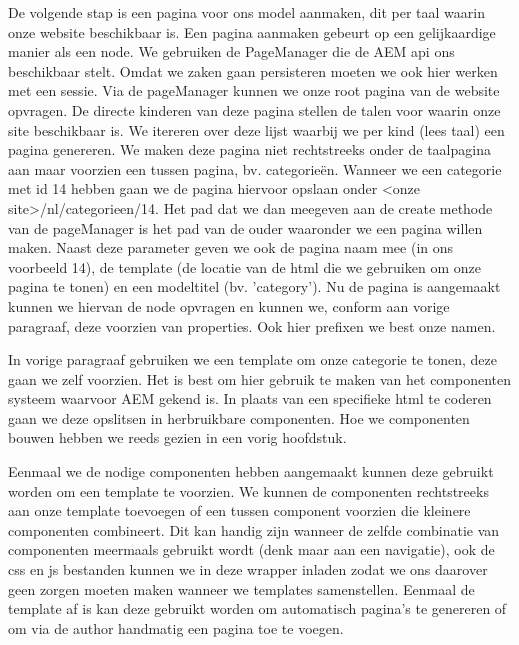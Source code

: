 \documentclass{article}
\begin{document}
	De volgende stap is een pagina voor ons model aanmaken, dit per taal waarin onze website beschikbaar is. Een pagina aanmaken gebeurt op een gelijkaardige manier als een node. We gebruiken de PageManager die de AEM api ons beschikbaar stelt. Omdat we zaken gaan persisteren moeten we ook hier werken met een sessie. Via de pageManager kunnen we onze root pagina van de website opvragen. De directe kinderen van deze pagina stellen de talen voor waarin onze site beschikbaar is. We itereren over deze lijst waarbij we per kind (lees taal) een pagina genereren. We maken deze pagina niet rechtstreeks onder de taalpagina aan maar voorzien een tussen pagina, bv. categorie\"en. Wanneer we een categorie met id 14 hebben gaan we de pagina hiervoor opslaan onder <onze site>/nl/categorieen/14. Het pad dat we dan meegeven aan de create methode van de pageManager is het pad van de ouder waaronder we een pagina willen maken. Naast deze parameter geven we ook de pagina naam mee (in ons voorbeeld 14), de template (de locatie van de html die we gebruiken om onze pagina te tonen) en een modeltitel (bv. 'category'). Nu de pagina is aangemaakt kunnen we hiervan de node opvragen en kunnen we, conform aan vorige paragraaf, deze voorzien van properties. Ook hier prefixen we best onze namen.
    \par
    In vorige paragraaf gebruiken we een template om onze categorie te tonen, deze gaan we zelf voorzien. Het is best om hier gebruik te maken van het componenten systeem waarvoor AEM gekend is. In plaats van een specifieke html te coderen gaan we deze opslitsen in herbruikbare componenten. Hoe we componenten bouwen hebben we reeds gezien in een vorig hoofdstuk.
    \par
    Eenmaal we de nodige componenten hebben aangemaakt kunnen deze gebruikt worden om een template te voorzien. We kunnen de componenten rechtstreeks aan onze template toevoegen of een tussen component voorzien die kleinere componenten combineert. Dit kan handig zijn wanneer de zelfde combinatie van componenten meermaals gebruikt wordt (denk maar aan een navigatie), ook de css en js bestanden kunnen we in deze wrapper inladen zodat we ons daarover geen zorgen moeten maken wanneer we templates samenstellen. Eenmaal de template af is kan deze gebruikt worden om automatisch pagina's te genereren of om via de author handmatig een pagina toe te voegen.
\end{document}
